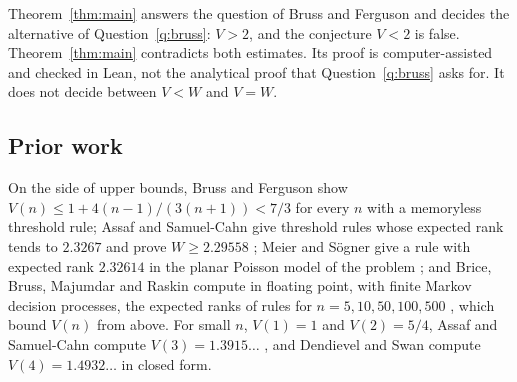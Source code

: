 \documentclass[11pt]{amsart}
\theoremstyle{definition}
\numberwithin{equation}{section}
\begin{document}
Theorem~\ref{thm:main} answers the question of Bruss and Ferguson and decides the alternative of Question~\ref{q:bruss}: $V>2$, and the conjecture $V<2$ is false. Theorem~\ref{thm:main} contradicts both estimates. Its proof is computer-assisted and checked in Lean, not the analytical proof that Question~\ref{q:bruss} asks for. It does not decide between $V<W$ and $V=W$.

\subsection*{Prior work}
On the side of upper bounds, Bruss and Ferguson \cite[(1.10) and Corollary~1]{BF93} show $V(n)\le1+4(n-1)/(3(n+1))<7/3$ for every $n$ with a memoryless threshold rule; Assaf and Samuel-Cahn give threshold rules whose expected rank tends to $2.3267$ and prove $W\ge2.29558$ \cite[Section~4 and Corollary~5.2]{AS96}; Meier and S\"ogner give a rule with expected rank $2.32614$ in the planar Poisson model of the problem \cite[Section~2, p.~335]{MS17}; and Brice, Bruss, Majumdar and Raskin \cite{BBMR25,BBMR26} compute in floating point, with finite Markov decision processes, the expected ranks of rules for $n=5,10,50,100,500$ \cite[Table~1]{BBMR26}, which bound $V(n)$ from above. For small $n$, $V(1)=1$ and $V(2)=5/4$, Assaf and Samuel-Cahn compute $V(3)=1.3915\ldots$ \cite[p.~829]{AS96}, and Dendievel and Swan \cite[Section~3]{DS16} compute $V(4)=1.4932\ldots$ in closed form.
\end{document}
